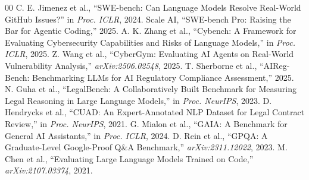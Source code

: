 \documentclass[conference]{IEEEtran}
\begin{document}
\begin{thebibliography}{00}
 C. E. Jimenez et al., ``SWE-bench: Can Language Models Resolve Real-World GitHub Issues?'' in \textit{Proc. ICLR}, 2024.
 Scale AI, ``SWE-bench Pro: Raising the Bar for Agentic Coding,'' 2025.
 A. K. Zhang et al., ``Cybench: A Framework for Evaluating Cybersecurity Capabilities and Risks of Language Models,'' in \textit{Proc. ICLR}, 2025.
 Z. Wang et al., ``CyberGym: Evaluating AI Agents on Real-World Vulnerability Analysis,'' \textit{arXiv:2506.02548}, 2025.
 T. Sherborne et al., ``AIReg-Bench: Benchmarking LLMs for AI Regulatory Compliance Assessment,'' 2025.
 N. Guha et al., ``LegalBench: A Collaboratively Built Benchmark for Measuring Legal Reasoning in Large Language Models,'' in \textit{Proc. NeurIPS}, 2023.
 D. Hendrycks et al., ``CUAD: An Expert-Annotated NLP Dataset for Legal Contract Review,'' in \textit{Proc. NeurIPS}, 2021.
 G. Mialon et al., ``GAIA: A Benchmark for General AI Assistants,'' in \textit{Proc. ICLR}, 2024.
 D. Rein et al., ``GPQA: A Graduate-Level Google-Proof Q\&A Benchmark,'' \textit{arXiv:2311.12022}, 2023.
 M. Chen et al., ``Evaluating Large Language Models Trained on Code,'' \textit{arXiv:2107.03374}, 2021.
\end{thebibliography}
\end{document}
